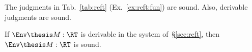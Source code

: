 \noindent
The judgments in
Tab.~\ref{tab:reft} (Ex.~\ref{ex:reft:fun}) are sound.
Also, derivable judgments are sound.

\begin{theorem}
\label{thm:sem:sound:reft}
If $\Env \thesis M : \RT$ is derivable in the system of~\S\ref{sec:reft},
then $\Env \thesis M : \RT$ is sound.
\end{theorem}






